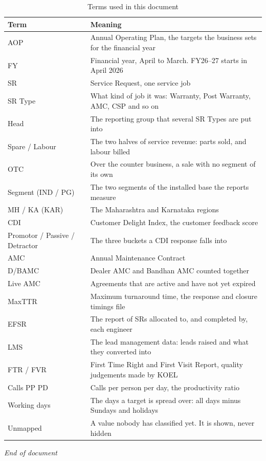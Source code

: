 \documentclass[11pt,a4paper]{article}
\begin{document}
\begin{table}[H]\centering\small
\renewcommand{\arraystretch}{1.15}
\begin{tabularx}{\linewidth}{@{}|p{3.5cm}|X|@{}}
\hline
\rowcolor{brdhead}\textbf{Term} & \textbf{Meaning}\\
\hline
AOP & Annual Operating Plan, the targets the business sets for the financial year\\
\hline
FY & Financial year, April to March. FY26--27 starts in April 2026\\
\hline
SR & Service Request, one service job\\
\hline
SR Type & What kind of job it was: Warranty, Post Warranty, AMC, CSP and so on\\
\hline
Head & The reporting group that several SR Types are put into\\
\hline
Spare / Labour & The two halves of service revenue: parts sold, and labour billed\\
\hline
OTC & Over the counter business, a sale with no segment of its own\\
\hline
Segment (IND / PG) & The two segments of the installed base the reports measure\\
\hline
MH / KA (KAR) & The Maharashtra and Karnataka regions\\
\hline
CDI & Customer Delight Index, the customer feedback score\\
\hline
Promotor / Passive / Detractor & The three buckets a CDI response falls into\\
\hline
AMC & Annual Maintenance Contract\\
\hline
D/BAMC & Dealer AMC and Bandhan AMC counted together\\
\hline
Live AMC & Agreements that are active and have not yet expired\\
\hline
MaxTTR & Maximum turnaround time, the response and closure timings file\\
\hline
EFSR & The report of SRs allocated to, and completed by, each engineer\\
\hline
LMS & The lead management data: leads raised and what they converted into\\
\hline
FTR / FVR & First Time Right and First Visit Report, quality judgements made by KOEL\\
\hline
Calls PP PD & Calls per person per day, the productivity ratio\\
\hline
Working days & The days a target is spread over: all days minus Sundays and holidays\\
\hline
Unmapped & A value nobody has classified yet. It is shown, never hidden\\
\hline
\end{tabularx}
\caption{Terms used in this document}
\end{table}

\vspace{12pt}
\begin{center}\small\itshape End of document\end{center}
\end{document}
